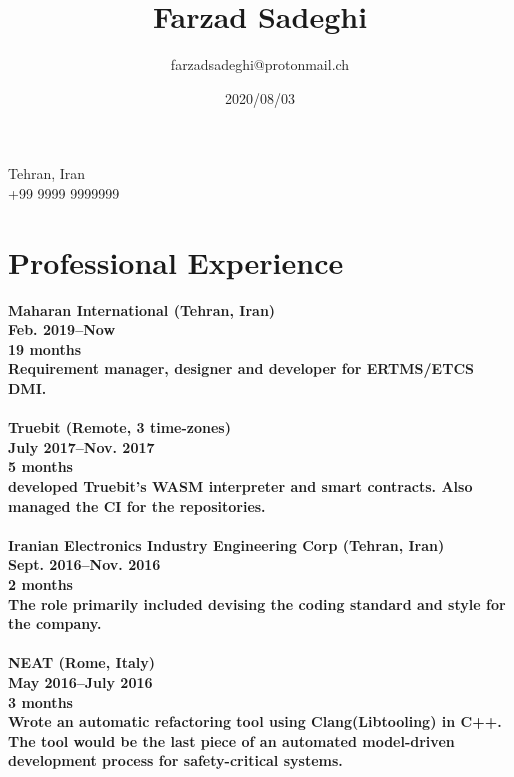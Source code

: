 \documentclass[8pt]{article}
\title{\bfseries Farzad Sadeghi}
\author{farzadsadeghi@protonmail.ch}
\date{2020/08/03}
\begin{document}
\begin{multicols}{2}
  \maketitle
  \begin{center}
    \begin{minipage}[ht]{0.2\textwidth}{\centering}
      \vspace*{\fill}
      \centering
      Tehran, Iran\\
      +99 9999 9999999
      \centering
      \vspace*{\fill}
    \end{minipage}
  \end{center}

  \section*{Professional Experience}
  \bf Maharan International (Tehran, Iran)\\
  Feb. 2019--Now\\
  19 months\\
  \normalfont Requirement manager, designer and developer for ERTMS/ETCS DMI.\\[5pt]
  \\
  \bf Truebit (Remote, 3 time-zones)\\
  July 2017--Nov. 2017\\
  5 months\\
  \normalfont developed Truebit's WASM interpreter and smart contracts. Also managed the CI for the repositories.\\[5pt]
  \\
  \bf Iranian Electronics Industry Engineering Corp (Tehran, Iran)\\
  Sept. 2016--Nov. 2016\\
  2 months\\
  \normalfont The role primarily included devising the coding standard and style for the company.\\[5pt]
  \\
  \bf NEAT (Rome, Italy)\\
  May 2016--July 2016\\
  3 months\\
  \normalfont Wrote an automatic refactoring tool using Clang(Libtooling) in C++. The tool would be the last piece of an automated model-driven development process for safety-critical systems.\\[5pt]
  \\

\end{multicols}
\end{document}
